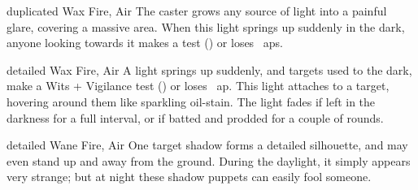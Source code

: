   {duplicated}%
  {Wax}%
  {Fire, Air}%
  {}%
  {The caster grows any source of light into a painful glare, covering a massive area.}%
  {When this light springs up suddenly in the dark, anyone looking towards it makes a  test (\tn[9]) or loses ~\glspl{ap}.}

  {detailed}%
  {Wax}%
  {Fire, Air}%
  {}%
  {A light springs up suddenly, and targets used to the dark, make a Wits + Vigilance test (\tn[9]) or loses ~\gls{ap}.}%
  {This light attaches to a target, hovering around them like sparkling oil-stain.
    The light fades if left in the darkness for a full \gls{interval}, or if batted and prodded for a couple of rounds.}

  {detailed}%
  {Wane}%
  {Fire, Air}%
  {}%
  {One target shadow forms a detailed silhouette, and may even stand up and away from the ground.}%
  {During the daylight, it simply appears very strange; but at night these shadow puppets can easily fool someone.}
